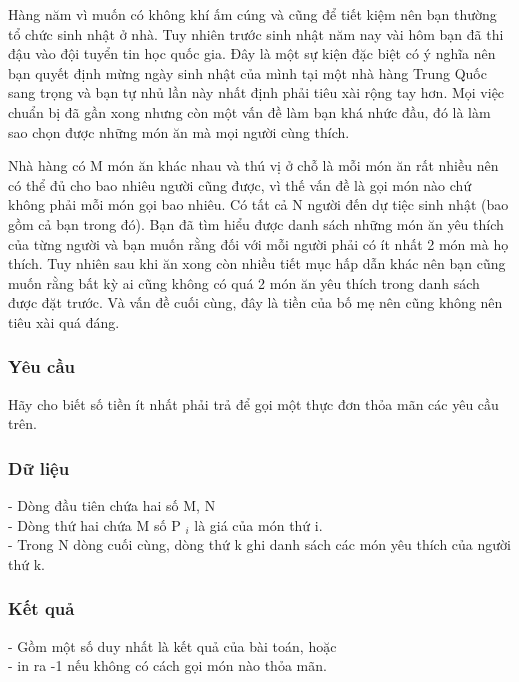 







   Hàng năm vì muốn có không khí ấm cúng và cũng để tiết kiệm nên bạn thường tổ chức sinh nhật ở nhà. Tuy nhiên trước sinh nhật năm nay vài hôm bạn đã thi đậu vào đội tuyển tin học quốc gia. Đây là một sự kiện đặc biệt có ý nghĩa nên bạn quyết định mừng ngày sinh nhật của mình tại một nhà hàng Trung Quốc sang trọng và bạn tự nhủ lần này nhất định phải tiêu xài rộng tay hơn. Mọi việc chuẩn bị đã gần xong nhưng còn một vấn đề làm bạn khá nhức đầu, đó là làm sao chọn được những món ăn mà mọi người cùng thích.  

   Nhà hàng có M món ăn khác nhau và thú vị ở chỗ là mỗi món ăn rất nhiều nên có thể đủ cho bao nhiêu người cũng được, vì thế vấn đề là gọi món nào chứ không phải mỗi món gọi bao nhiêu. Có tất cả N người đến dự tiệc sinh nhật (bao gồm cả bạn trong đó). Bạn đã tìm hiểu được danh sách những món ăn yêu thích của từng người và bạn muốn rằng đối với mỗi người phải có ít nhất 2 món mà họ thích. Tuy nhiên sau khi ăn xong còn nhiều tiết mục hấp dẫn khác nên bạn cũng muốn rằng bất kỳ ai cũng không có quá 2 món ăn yêu thích trong danh sách được đặt trước. Và vấn đề cuối cùng, đây là tiền của bố mẹ nên cũng không nên tiêu xài quá đáng.  

\subsubsection{   Yêu cầu  }

   Hãy cho biết số tiền ít nhất phải trả để gọi một thực đơn thỏa mãn các yêu cầu trên.  

\subsubsection{   Dữ liệu  }

   - Dòng đầu tiên chứa hai số M, N   
\\   - Dòng thứ hai chứa M số P   $_    i   $   là giá của món thứ i.   
\\   - Trong N dòng cuối cùng, dòng thứ k ghi danh sách các món yêu thích của người thứ k.  

\subsubsection{   Kết quả  }

   - Gồm một số duy nhất là kết quả của bài toán, hoặc   
\\   - in ra -1 nếu không có cách gọi món nào thỏa mãn.  


